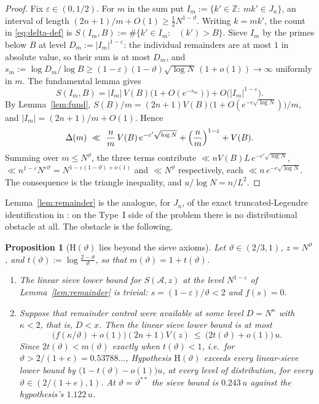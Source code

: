 \documentclass[11pt]{article}
\newtheorem{proposition}[theorem]{Proposition}
\theoremstyle{remark}
\DeclareMathOperator{\pmin}{P^{-}}
\newcommand{\N}{N}
\newcommand{\J}{J_n}
\newcommand{\A}{\mathcal{A}}
\newcommand{\thstar}{\vartheta^{**}}
\begin{document}
\begin{proof}
Fix $\varepsilon\in(0,1/2)$. For $m$ in the sum put $I_m:=\{k'\in\mathbb{Z}:\ mk'\in\J\}$,
an interval of length $(2n+1)/m+O(1)\ge \tfrac12\N^{1-\vartheta}$. Writing $k=mk'$, the count
in \eqref{eq:delta-def} is $S(I_m,B):=\#\{k'\in I_m:\ \pmin(k')>B\}$. Sieve $I_m$ by
the primes below $B$ at level $D_m:=|I_m|^{1-\varepsilon}$: the individual remainders
are at most $1$ in absolute value, so their sum is at most $D_m$, and
$s_m:=\log D_m/\log B\ge (1-\varepsilon)(1-\vartheta)\sqrt{\log\N}\,(1+o(1))\to\infty$
uniformly in $m$. The fundamental lemma \cite[Thm.~6.9]{FriedlanderIwaniec} gives
\[
S(I_m,B)=|I_m|\,V(B)\bigl(1+O(e^{-s_m})\bigr)+O\bigl(|I_m|^{1-\varepsilon}\bigr).
\]
By Lemma~\ref{lem:fund}, $S(B)/m=(2n+1)V(B)\bigl(1+O(e^{-c\sqrt{\log\N}})\bigr)/m$, and
$|I_m|=(2n+1)/m+O(1)$. Hence
\[
\Delta(m)\ \ll\ \frac{n}{m}\,V(B)\,e^{-c'\sqrt{\log \N}}+\Bigl(\frac nm\Bigr)^{1-\varepsilon}+V(B).
\]
Summing over $m\le\N^{\vartheta}$, the three terms contribute
$\ll nV(B)L\,e^{-c'\sqrt{\log\N}}$, $\ll n^{1-\varepsilon}\N^{\varepsilon\vartheta}
=\N^{1-\varepsilon(1-\vartheta)+o(1)}$ and $\ll \N^{\vartheta}$ respectively, each
$\ll n\,e^{-c\sqrt{\log\N}}$. The consequence is the triangle inequality, and
$u/\log\N=n/L^2$.
\end{proof}

Lemma~\ref{lem:remainder} is the analogue, for $\J$, of the exact truncated-Legendre
identification in \cite[\S\S6--7]{RossShells}: on the Type~I side of the problem there
is no distributional obstacle at all. The obstacle is the following.

\begin{proposition}[$\mathrm{H}(\vartheta)$ lies beyond the sieve axioms]\label{prop:parity}
Let $\vartheta\in(2/3,1)$, $z=\N^{\vartheta}$, and
$t(\vartheta):=\log\frac{2-\vartheta}{\vartheta}$, so that $m(\vartheta)=1+t(\vartheta)$.
\begin{enumerate}
\item[(i)] The linear sieve lower bound for $S(\A,z)$ at the level $\N^{1-\varepsilon}$
of Lemma~\ref{lem:remainder} is trivial: $s=(1-\varepsilon)/\vartheta<2$ and $f(s)=0$.
\item[(ii)] Suppose that remainder control were available at some level $D=\N^{\kappa}$
with $\kappa<2$, that is, $D<x$. Then the linear sieve lower bound is at most
\[
\bigl(f(\kappa/\vartheta)+o(1)\bigr)(2n+1)V(z)\ \le\ \bigl(2t(\vartheta)+o(1)\bigr)\,u .
\]
Since $2t(\vartheta)<m(\vartheta)$ exactly when $t(\vartheta)<1$, i.e.\ for
$\vartheta>2/(1+e)=0.53788\ldots$, Hypothesis $\mathrm{H}(\vartheta)$ exceeds every
linear-sieve lower bound by $\bigl(1-t(\vartheta)-o(1)\bigr)u$, at every level of
distribution, for every $\vartheta\in(2/(1+e),1)$. At $\vartheta=\thstar$ the sieve
bound is $0.243\,u$ against the hypothesis's $1.122\,u$.
\end{enumerate}
\end{proposition}
\end{document}
